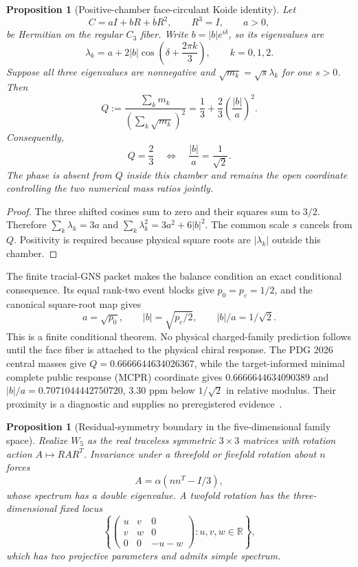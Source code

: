 \documentclass[11pt]{article}
\newtheorem{proposition}[theorem]{Proposition}
\begin{document}
\begin{proposition}[Positive-chamber face-circulant Koide identity]
\label{prop:compact-positive-circulant-koide}
Let
\[
 C=aI+bR+\overline bR^2,\qquad R^3=I,\qquad a>0,
\]
be Hermitian on the regular \(C_3\) fiber. Write \(b=|b|e^{i\delta}\), so its
eigenvalues are
\[
 \lambda_k=a+2|b|\cos\!\left(\delta+\frac{2\pi k}{3}\right),
 \qquad k=0,1,2.
\]
Suppose all three eigenvalues are nonnegative and
\(\sqrt{m_k}=\sqrt{s}\lambda_k\) for one \(s>0\). Then
\[
 Q:=\frac{\sum_km_k}{(\sum_k\sqrt{m_k})^2}
 =\frac13+\frac23\left(\frac{|b|}{a}\right)^2.
\]
Consequently,
\[
 Q=\frac23\quad\Longleftrightarrow\quad\frac{|b|}{a}=\frac1{\sqrt2}.
\]
The phase is absent from \(Q\) inside this chamber and remains the open
coordinate controlling the two numerical mass ratios jointly.
\end{proposition}

\begin{proof}
The three shifted cosines sum to zero and their squares sum to \(3/2\).
Therefore \(\sum_k\lambda_k=3a\) and
\(\sum_k\lambda_k^2=3a^2+6|b|^2\). The common scale \(s\) cancels from
\(Q\). Positivity is required because physical square roots are
\(|\lambda_k|\) outside this chamber.
\end{proof}

The finite tracial-GNS packet makes the balance condition an exact conditional
consequence. Its equal rank-two event blocks give \(p_0=p_c=1/2\), and the
canonical square-root map gives
\[
 a=\sqrt{p_0},\qquad |b|=\sqrt{p_c/2},\qquad |b|/a=1/\sqrt2.
\]
This is a finite conditional theorem. No physical charged-family prediction
follows until the face fiber is attached to the physical chiral response.
The PDG 2026 central masses give
\(Q=0.6666644634026367\), while the target-informed minimal
complete public response (MCPR) coordinate gives \(0.6666644634090389\) and
\(|b|/a=0.7071044442750720\), \(3.30\) ppm below \(1/\sqrt2\)
in relative modulus. Their proximity is a diagnostic and supplies no
preregistered evidence~\cite{pdg2026}.

\begin{proposition}[Residual-symmetry boundary in the five-dimensional family space]
Realize \(W_5\) as the real traceless symmetric \(3\times3\) matrices with
rotation action \(A\mapsto RAR^T\). Invariance under a threefold or fivefold
rotation about \(n\) forces
\[
 A=\alpha(nn^T-I/3),
\]
whose spectrum has a double eigenvalue. A twofold rotation has the
three-dimensional fixed locus
\[
 \left\{
 \begin{pmatrix}
 u&v&0\\ v&w&0\\0&0&-u-w
 \end{pmatrix}:u,v,w\in\mathbb R
 \right\},
\]
which has two projective parameters and admits simple spectrum.
\end{proposition}
\end{document}
